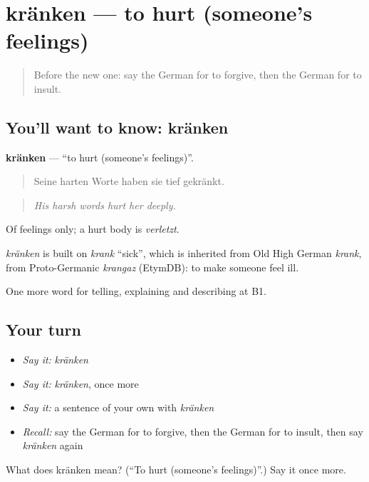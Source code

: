 \section[kränken]{kränken — to hurt (someone's feelings)}

\label{lesson:GE-C478-kraenken}



\begin{quote}
Before the new one: say the German for to forgive, then the German for to insult.
\end{quote}

\subsection*{You'll want to know: kränken}
\textbf{kränken} — \textquotedblleft{}to hurt (someone's feelings)\textquotedblright{}.

\begin{quote}
Seine harten Worte haben sie tief gekränkt.
\end{quote}

\begin{quote}
\emph{His harsh words hurt her deeply.}
\end{quote}

Of feelings only; a hurt body is \emph{verletzt}.

\begin{cousinweb}
\emph{kränken} is built on \emph{krank} \textquotedblleft{}sick\textquotedblright{}, which is inherited from Old High German \emph{krank}, from Proto-Germanic \emph{krangaz} (EtymDB): to make someone feel ill.
\end{cousinweb}

\begin{grammarlens}[title={What you've built}]
One more word for telling, explaining and describing at B1.
\end{grammarlens}

\subsection*{Your turn}
\begin{itemize}
\raggedright
  \item \emph{Say it:} \emph{kränken}
  \item \emph{Say it:} \emph{kränken}, once more
  \item \emph{Say it:} a sentence of your own with \emph{kränken}
  \item \emph{Recall:} say the German for to forgive, then the German for to insult, then say \emph{kränken} again
\end{itemize}

\begin{tcolorbox}[breakable,colback=teal!4,colframe=teal!35!black,title={Before you move on}]
What does kränken mean? (\textquotedblleft{}To hurt (someone's feelings)\textquotedblright{}.) Say it once more.
\end{tcolorbox}

